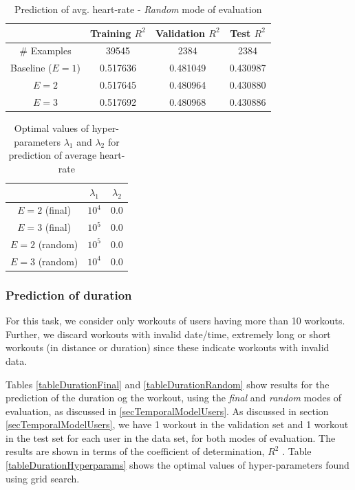 \documentclass{acm_proc_article-sp}
\begin{document}
\begin{table}[h]
\centering
\begin{tabular}{|c|c|c|c|} \hline
& Training $R^2$ & Validation $R^2$ & Test $R^2$ \\ \hline
\# Examples & 39545 & 2384  &  2384 \\ \hline
Baseline ($E = 1$) & 0.517636 & 0.481049 & 0.430987 \\ \hline
$E = 2$  & 0.517645 & 0.480964 & 0.430880 \\ \hline
$E = 3$  & 0.517692 & 0.480968 & 0.430886 \\ \hline
\end{tabular}
\caption{Prediction of avg. heart-rate - \emph{Random} mode of evaluation }
\label{tableAvgHrRandom}
\end{table}

\begin{table}[h]
\centering
\begin{tabular}{|c|c|c|} \hline
& $\lambda_1$ & $\lambda_2$ \\ \hline
$E = 2$ (final) & $10^4$ & $0.0$ \\ \hline
$E = 3$ (final) & $10^5$ & $0.0$ \\ \hline
$E = 2$ (random) & $10^5$ & $0.0$ \\ \hline
$E = 3$ (random) & $10^4$ & $0.0$ \\ \hline
\end{tabular}
\caption{Optimal values of hyper-parameters $\lambda_1$ and $\lambda_2$ for prediction of average heart-rate}
\label{tableAvgHrHyperparams}
\end{table}

\subsubsection{Prediction of duration}

For this task, we consider only workouts of users having more than 10 workouts. Further, we discard workouts with invalid date/time, extremely long or short workouts (in distance or duration) since these indicate workouts with invalid data.

Tables \ref{tableDurationFinal} and \ref{tableDurationRandom} show results for the prediction of the duration og the workout, using the  \emph{final} and \emph{random} modes of evaluation, as discussed in \ref{secTemporalModelUsers}. As discussed in section \ref{secTemporalModelUsers}, we have 1 workout in the validation set and 1 workout in the test set for each user in the data set, for both modes of evaluation. The results are shown in terms of the coefficient of determination, $R^2$ \cite{r2Wiki}. Table \ref{tableDurationHyperparams} shows the optimal values of hyper-parameters found using grid search.
\end{document}
